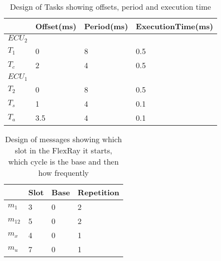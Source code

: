 \begin{table}[htbp!]
\centering
\begin{tabular}{|l|l|l|l|}
\hline
   & Offset(ms) & Period(ms) & ExecutionTime(ms) \\ \hline
   $ECU_2$ & & & \\ \hline
   $T_1$ & 0          & 8          & 0.5               \\ \hline
   $T_c$ & 2          & 4          & 0.5               \\ \hline
   $ECU_1$ & & & \\ \hline
	$T_2 $& 0          & 8          & 0.5               \\ \hline
	$T_s$ & 1          & 4          & 0.1               \\ \hline
	$T_a$ & 3.5        & 4          & 0.1               \\ \hline

\end{tabular}
\label{tab:flextsk}
\caption{Design of Tasks showing offsets, period and execution time}
\end{table}


\begin{table}[htbp!]
	\centering
	
	\begin{tabular}{|l|l|l|l|}
		\hline
		& Slot & Base & Repetition \\ \hline
		$m_1$  & 3    & 0    & 2          \\ \hline
		$m_{12}$ & 5    & 0    & 2          \\ \hline
		$m_x$  & 4    & 0    & 1          \\ \hline
		$m_u$  & 7    & 0    & 1          \\ \hline
	\end{tabular}
	\label{tab:flexmsg}
	\caption{Design of messages showing which slot in the FlexRay it starts, which cycle is the base and then how frequently}
\end{table}
